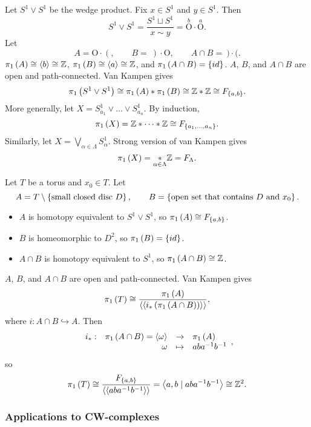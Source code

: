 \begin{example*}
Let $ S^1 \vee S^1 $ be the wedge product. Fix $ x \in S^1 $ and $ y \in S^1 $. Then
$$ S^1 \vee S^1 = \dfrac{S^1 \sqcup S^1}{x \sim y} = \overset{b}{\text{O}}\cdot\overset{a}{\text{O}}. $$
Let
$$ A = \text{O}\cdot(, \qquad B = \ )\cdot\text{O}, \qquad A \cap B = \ )\cdot(. $$
$ \pi_1\left( A \right) \cong \left\langle b \right\rangle \cong \mathbb{Z} $, $ \pi_1\left( B \right) \cong \left\langle a \right\rangle \cong \mathbb{Z} $, and $ \pi_1\left( A \cap B \right) = \left\{ id \right\} $. $ A $, $ B $, and $ A \cap B $ are open and path-connected. Van Kampen gives
$$ \pi_1\left( S^1 \vee S^1 \right) \cong \pi_1\left( A \right) * \pi_1\left( B \right) \cong \mathbb{Z} * \mathbb{Z} \cong F_{\left\{ a, b \right\}}. $$
More generally, let $ X = S_{a_1}^1 \vee \dots \vee S_{a_n}^1 $. By induction,
$$ \pi_1\left( X \right) = \mathbb{Z} * \dots * \mathbb{Z} \cong F_{\left\{ a_1, \dots, a_n \right\}}. $$
Similarly, let $ X = \bigvee_{\alpha \in \Lambda} S_\alpha^1 $. Strong version of van Kampen gives
$$ \pi_1\left( X \right) = \underset{\alpha \in \Lambda}{*} \mathbb{Z} = F_\Lambda. $$
\end{example*}

\begin{example*}
Let $ T $ be a torus and $ x_0 \in T $. Let
$$ A = T \setminus \cb{\text{small closed disc} \ D}, \qquad B = \cb{\text{open set that contains} \ D \ \text{and} \ x_0}. $$
\begin{itemize}
\item $ A $ is homotopy equivalent to $ S^1 \vee S^1 $, so $ \pi_1\left( A \right) \cong F_{\left\{ a, b \right\}} $.
\item $ B $ is homeomorphic to $ D^2 $, so $ \pi_1\left( B \right) = \left\{ id \right\} $.
\item $ A \cap B $ is homotopy equivalent to $ S^1 $, so $ \pi_1\left( A \cap B \right) \cong \mathbb{Z} $.
\end{itemize}
$ A $, $ B $, and $ A \cap B $ are open and path-connected. Van Kampen gives
$$ \pi_1\left( T \right) \cong \dfrac{\pi_1\left( A \right)}{\left\langle \left\langle i_*\left( \pi_1\left( A \cap B \right) \right) \right\rangle \right\rangle}, $$
where $ i : A \cap B \hookrightarrow A $. Then
$$ \function[i_*]{\pi_1\rb{A \cap B} = \ab{\omega}}{\pi_1\rb{A}}{\omega}{aba^{-1}b^{-1}}, $$
so
$$ \pi_1\left( T \right) \cong \dfrac{F_{\left\{ a, b \right\}}}{\left\langle \left\langle aba^{-1}b^{-1} \right\rangle \right\rangle} = \left\langle a, b \mid aba^{-1}b^{-1} \right\rangle \cong \mathbb{Z}^2. $$
\end{example*}

\subsubsection{Applications to CW-complexes}

